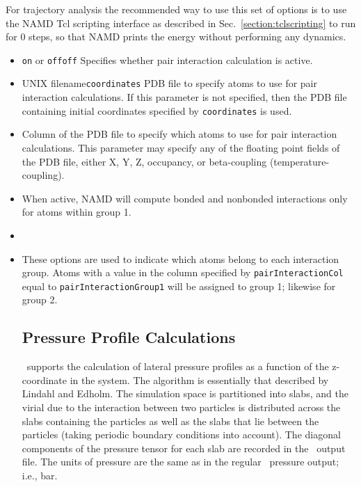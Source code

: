 For trajectory analysis the 
recommended way to use this set of options is to use the NAMD Tcl scripting 
interface as described in Sec.~\ref{section:tclscripting} to run for
0 steps, so that NAMD prints the energy without performing any dynamics.

\begin{itemize}

\item
{}
{{\tt on} or {\tt off}}{{\tt off}}
{Specifies whether pair interaction calculation is active.}

\item
{}
{UNIX filename}{{\tt coordinates}}
{PDB file to specify atoms to use for pair interaction calculations.  If 
this parameter is not specified, then the PDB file containing initial 
coordinates specified by {\tt coordinates} is used.}

\item
{}
{
Column of the PDB file to specify which atoms to use for pair interaction
calculations.  This parameter may specify any of the floating point
fields of the PDB file, either X, Y, Z, occupancy, or beta-coupling
(temperature-coupling).  
}

\item
{}
{
When active, NAMD will compute bonded and nonbonded interactions only for atoms 
within group 1.  
}
 
\item
{}

\item
{}
{
These options are used to indicate which atoms belong to each interaction 
group.  Atoms with a value in the column specified by {\tt pairInteractionCol} 
equal to {\tt pairInteractionGroup1} will be assigned to group 1; likewise
for group 2.
}

\subsection{Pressure Profile Calculations}
\NAMD\ supports the calculation of lateral pressure profiles as a function of
the z-coordinate in the system.  The algorithm is essentially that described
by Lindahl and Edholm.  The simulation space is partitioned into slabs, and
the virial due to the interaction between two particles is distributed across 
the slabs containing the particles as well as the slabs that lie between the
particles (taking periodic boundary conditions into account).  The diagonal
components of the pressure tensor for each slab are recorded in the 
\NAMD\ output file.  The units of pressure are the same as in the regular 
\NAMD\ pressure output; i.e., bar.


\end{itemize}
